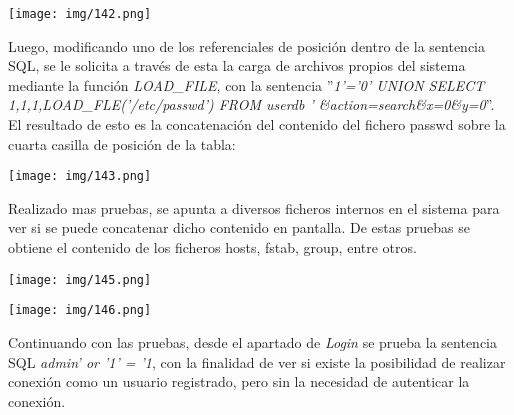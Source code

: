 \documentclass[12pt,oneside,a4paper]{book}
\begin{document}
\begin{enumerate}
\vspace{1em}

\begin{center}
    \texttt{[image: img/142.png]}
\end{center}

\vspace{1em}

\vspace{1em}

\hspace{20pt}
Luego, modificando uno de los referenciales de posición dentro de la sentencia SQL, se le solicita a través de esta la carga de archivos propios del sistema mediante la función \textit{LOAD\_FILE}, con la sentencia ''\textit{1'='0' UNION SELECT 1,1,1,LOAD\_FLE('/etc/passwd') FROM userdb ' \&action=search\&x=0\&y=0}''. El resultado de esto es la concatenación del contenido del fichero passwd sobre la cuarta casilla de posición de la tabla:

\vspace{1em}

\begin{center}
    \texttt{[image: img/143.png]}
\end{center}

\vspace{1em}

\hspace{20pt}
Realizado mas pruebas, se apunta a diversos ficheros internos en el sistema para ver si se puede concatenar dicho contenido en pantalla. De estas pruebas se obtiene el contenido de los ficheros hosts, fstab, group, entre otros.

\vspace{1em}

\begin{center}
    \texttt{[image: img/145.png]}
\end{center}

\vspace{1em}

\begin{center}
    \texttt{[image: img/146.png]}
\end{center}

\vspace{1em}

\hspace{20pt}
Continuando con las pruebas, desde el apartado de \textit{Login} se prueba la sentencia SQL \textit{admin' or '1' = '1}, con la finalidad de ver si existe la posibilidad de realizar conexión como un usuario registrado, pero sin la necesidad de autenticar la conexión.
\vspace{1em}


\end{enumerate}
\end{document}
